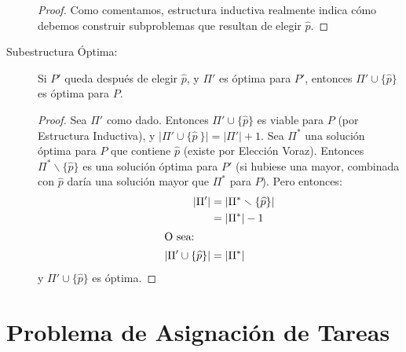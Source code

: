 \begin{description}
\begin{proof}
      Como comentamos,
      estructura inductiva realmente indica cómo debemos construir
      subproblemas que resultan de elegir \(\widehat{p}\).
    \end{proof}
   \item[Subestructura Óptima:]
     Si \(P'\) queda después de elegir \(\widehat p\),
     y \(\Pi'\) es óptima para \(P'\),
     entonces \(\Pi'\cup \{\widehat p\}\) es óptima para \(P\).
     \begin{proof}
       Sea \(\Pi'\) como dado.
       Entonces \(\Pi' \cup \{\widehat p\}\) es viable para \(P\)
       (por Estructura Inductiva),
       y \(\lvert \Pi' \cup \{ \widehat p\ \} \rvert
              = \lvert \Pi' \rvert + 1\).
       Sea \(\Pi^*\) una solución óptima para \(P\)
       que contiene \(\widehat{p}\)
       (existe por Elección Voraz).
       Entonces \(\Pi^* \smallsetminus \{ \widehat{p} \}\)
       es una solución óptima para \(P'\)
       (si hubiese una mayor,
        combinada con \(\widehat{p}\) daría una solución mayor que \(\Pi^*\)
        para \(P\)).
       Pero entonces:
       \begin{align*}
         \lvert \Pi' \rvert
           &= \lvert \Pi^* \smallsetminus \{ \widehat{p} \} \rvert \\
           &= \lvert \Pi^* \rvert - 1 \\
        \intertext{O sea:}
         \lvert \Pi'\cup \{\widehat{p} \} \rvert
           &= \lvert \Pi^* \rvert
       \end{align*}
       y \(\Pi' \cup \{\widehat{p}\}\) es óptima.
     \end{proof}
   \end{description}

\section{Problema de Asignación de Tareas}

